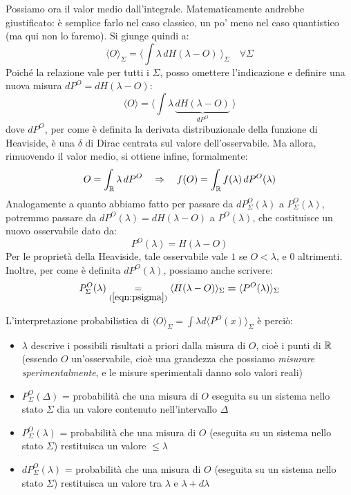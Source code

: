 \documentclass[FisicaTeorica.tex]{subfiles}
\begin{document}
Possiamo ora  il valor medio dall'integrale. Matematicamente andrebbe giustificato: è semplice farlo nel caso classico, un po' meno nel caso quantistico (ma qui non lo faremo). Si giunge quindi a:
\[
\langle O \rangle_\Sigma = \langle \int \lambda\, dH(\lambda-O) \> \rangle_\Sigma\quad \forall \Sigma
\]
Poiché la relazione vale per tutti i $\Sigma$, posso omettere l'indicazione e definire una nuova misura $dP^O = dH(\lambda-O)$:
\[
\langle O \rangle = \langle \int \lambda \, \underbrace{dH(\lambda-O)}_{dP^O} \> \rangle
\]
dove $dP^O$, per come è definita la derivata distribuzionale della funzione di Heaviside, è una $\delta$ di Dirac centrata sul valore dell'osservabile. Ma allora, rimuovendo il valor medio, si ottiene infine, formalmente:
\begin{equation}
O = \int_{\mathbb{R}} \lambda\, dP^O \quad \Rightarrow \quad f(O) = \int_{\mathbb{R}} f(\lambda)\, dP^O(\lambda)
\label{eqn:osservabileformale}
\end{equation}
Analogamente a quanto abbiamo fatto per passare da $dP_\Sigma^O(\lambda)$ a $P_\Sigma^O(\lambda)$, potremmo passare da $dP^O(\lambda) = dH(\lambda-O)$ a $P^O(\lambda)$, che costituisce un nuovo osservabile dato da:
\begin{equation}
P^O(\lambda) = H(\lambda-O)
\label{eqn:POdef}
\end{equation}
Per le proprietà della Heaviside, tale osservabile vale $1$ se $O < \lambda$, e $0$ altrimenti.
Inoltre, per come è definita $dP^O(\lambda)$, possiamo anche scrivere:
\[
P_\Sigma^O(\lambda) \underset{(\ref{eqn:psigma})}{=} \langle H(\lambda-O)\rangle_\Sigma \bm{=} \langle P^O(\lambda)\rangle_\Sigma
\]
\begin{comment}
È naturale allora definire l'osservabile 
$P^O\left(\lambda\right)=H(\lambda -O)$, che quindi vale $1$ se $O<\lambda$ e $0$ altrimenti.\\
Allora $\langle f(O)\rangle_\Sigma = \int f(\lambda) d\langle P^O (\lambda)\rangle_\Sigma$ o formalmente:
\[
f\left(O\right)=\int f\left(\lambda\right)dP^O\left(\lambda\right); \quad O=\int \lambda dP^O\left(\lambda\right)
\]
\end{comment}
L'interpretazione probabilistica di $\langle O \rangle_\Sigma = \int \lambda d\langle P^O(x)\rangle_\Sigma$ è perciò:
\begin{itemize}
    \item $\lambda$ descrive i possibili risultati a priori dalla misura di $O$, cioè i punti di $\mathbb{R}$ (essendo $O$ un'osservabile, cioè una grandezza che possiamo \textit{misurare sperimentalmente}, e le misure sperimentali danno solo valori reali)
    \item $P_\Sigma^O\left(\Delta\right)$ = probabilità che una misura di $O$ eseguita su un sistema nello stato $\Sigma$ dia un valore contenuto nell'intervallo $\Delta$
    \item $P_\Sigma^O\left(\lambda\right)$ = probabilità che una misura di $O$ (eseguita su un sistema nello stato $\Sigma$) restituisca un valore $\leq \lambda$
    \item $dP_\Sigma^O\left(\lambda\right)$ = probabilità che una misura di $O$ (eseguita su un sistema nello stato $\Sigma$) restituisca un valore tra $\lambda$ e $\lambda + d\lambda$
\end{itemize}
\end{document}
